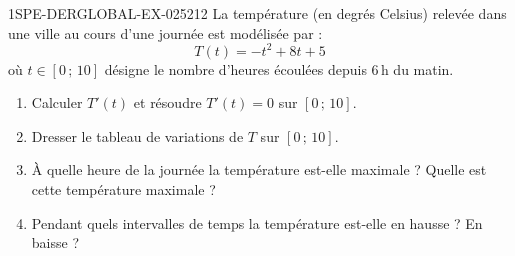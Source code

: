\begin{exercice}{1SPE-DERGLOBAL-EX-025}{2}{12}
La température (en degrés Celsius) relevée dans une ville au cours d'une journée est modélisée par :
\[
T(t) = -t^2 + 8t + 5
\]
où $t \in [0\,;\,10]$ désigne le nombre d'heures écoulées depuis $6\,\text{h}$ du matin.

\begin{enumerate}
\item Calculer $T'(t)$ et résoudre $T'(t) = 0$ sur $[0\,;\,10]$.
\item Dresser le tableau de variations de $T$ sur $[0\,;\,10]$.
\item À quelle heure de la journée la température est-elle maximale ? Quelle est cette température maximale ?
\item Pendant quels intervalles de temps la température est-elle en hausse ? En baisse ?
\end{enumerate}
\end{exercice}

